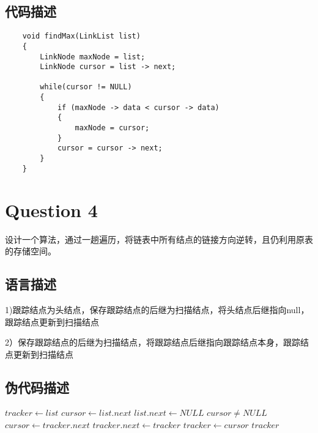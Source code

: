 \documentclass{article}
\begin{document}
\subsection{代码描述}

\begin{verbatim}
    void findMax(LinkList list)
    {
        LinkNode maxNode = list;
        LinkNode cursor = list -> next;

        while(cursor != NULL)
        {
            if (maxNode -> data < cursor -> data)
            {
                maxNode = cursor;
            }
            cursor = cursor -> next;
        }
    }

\end{verbatim}

\section{Question 4} 

设计一个算法，通过一趟遍历，将链表中所有结点的链接方向逆转，且仍利用原表的存储空间。


\subsection{语言描述} 

1)跟踪结点为头结点，保存跟踪结点的后继为扫描结点，将头结点后继指向null，跟踪结点更新到扫描结点\par
2）保存跟踪结点的后继为扫描结点，将跟踪结点后继指向跟踪结点本身，跟踪结点更新到扫描结点\par

\subsection{伪代码描述}



\begin{codebox}
\li $ tracker \gets list $
\li $ cursor \gets list.next $
\li $ list.next \gets NULL$
\li \While $ cursor \neq NULL $
\li 	\Do
\li 		$ cursor \gets tracker.next $
\li 	 	$ tracker.next \gets tracker $
\li 		$ tracker \gets cursor $
	\End
\li \Return $ tracker $ 

\end{codebox}
\end{document}
